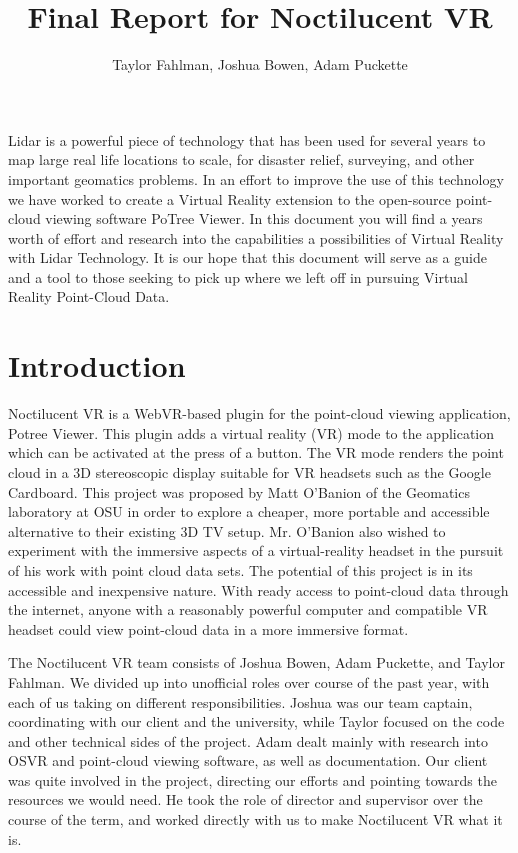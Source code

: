 \documentclass[draftclsnofoot,onecolumn]{IEEEtran}
\begin{document}
\title {Final Report for Noctilucent VR}
\author {Taylor Fahlman, Joshua Bowen, Adam Puckette}

\maketitle

\abstract
Lidar is a powerful piece of technology that has been used for several years to map large real life locations to scale, for disaster relief, surveying, and other important geomatics problems.
In an effort to improve the use of this technology we have worked to create a Virtual Reality extension to the open-source point-cloud viewing software PoTree Viewer.
In this document you will find a years worth of effort and research into the capabilities a possibilities of Virtual Reality with Lidar Technology.
It is our hope that this document will serve as a guide and a tool to those seeking to pick up where we left off in pursuing Virtual Reality Point-Cloud Data.

\newpage
\section{Introduction}

Noctilucent VR is a WebVR-based plugin for the point-cloud viewing application, Potree Viewer. 
This plugin adds a virtual reality (VR) mode to the application which can be activated at the press of a button. 
The VR mode renders the point cloud in a 3D stereoscopic display suitable for VR headsets such as the Google Cardboard. 
This project was proposed by Matt O'Banion of the Geomatics laboratory at OSU in order to explore a cheaper, more portable and accessible alternative to their existing 3D TV setup. 
Mr. O'Banion also wished to experiment with the immersive aspects of a virtual-reality headset in the pursuit of his work with point cloud data sets. 
The potential of this project is in its accessible and inexpensive nature. 
With ready access to point-cloud data through the internet, anyone with a reasonably powerful computer and compatible VR headset could view point-cloud data in a more immersive format. 

The Noctilucent VR team consists of Joshua Bowen, Adam Puckette, and Taylor Fahlman. 
We divided up into unofficial roles over course of the past year, with each of us taking on different responsibilities. 
Joshua was our team captain, coordinating with our client and the university, while Taylor focused on the code and other technical sides of the project. 
Adam dealt mainly with research into OSVR and point-cloud viewing software, as well as documentation.
Our client was quite involved in the project, directing our efforts and pointing towards the resources we would need. 
He took the role of director and supervisor over the course of the term, and worked directly with us to make Noctilucent VR what it is.
\end{document}
